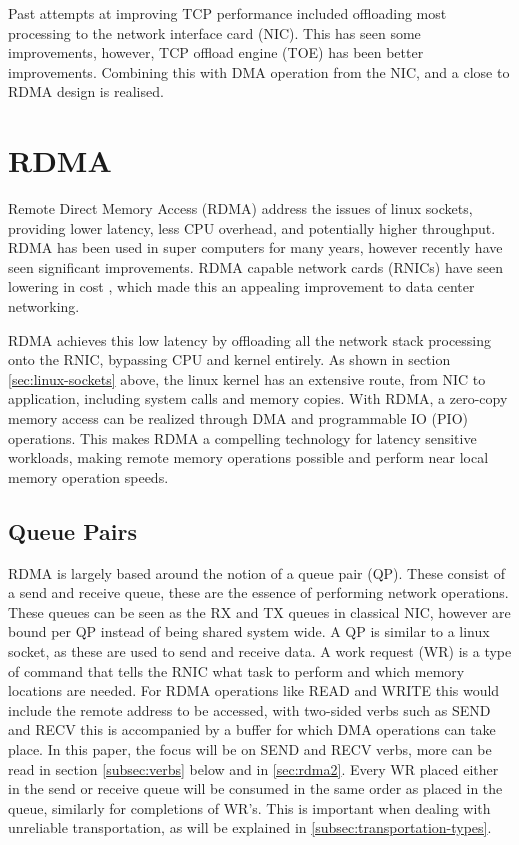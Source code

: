 Past attempts at improving TCP performance included offloading most processing to the network interface card (NIC).
This has seen some improvements, however, TCP offload engine (TOE) has been better improvements.
Combining this with DMA operation from the NIC, and a close to RDMA design is realised.

\section[RDMA]{RDMA}\label{sec:rdma}
Remote Direct Memory Access (RDMA) address the issues of linux sockets, providing lower latency, less CPU overhead, and potentially higher throughput.
RDMA has been used in super computers for many years, however recently have seen significant improvements.
RDMA capable network cards (RNICs) have seen lowering in cost \cite{kalia2016design}, which made this an appealing improvement to data center networking.

RDMA achieves this low latency by offloading all the network stack processing onto the RNIC, bypassing CPU and kernel entirely.
As shown in section \ref{sec:linux-sockets} above, the linux kernel has an extensive route, from NIC to application, including system calls and memory copies.
With RDMA, a zero-copy memory access can be realized through DMA and programmable IO (PIO) operations.
This makes RDMA a compelling technology for latency sensitive workloads, making remote memory operations possible and perform near local memory operation speeds.

\subsection{Queue Pairs}\label{subsec:queue-pairs}
RDMA is largely based around the notion of a queue pair (QP).
These consist of a send and receive queue, these are the essence of performing network operations.
These queues can be seen as the RX and TX queues in classical NIC, however are bound per QP instead of being shared system wide.
A QP is similar to a linux socket, as these are used to send and receive data.
A work request (WR) is a type of command that tells the RNIC what task to perform and which memory locations are needed.
For RDMA operations like READ and WRITE this would include the remote address to be accessed, with two-sided verbs such as SEND and RECV this is accompanied by a buffer for which DMA operations can take place.
In this paper, the focus will be on SEND and RECV verbs, more can be read in section \ref{subsec:verbs} below and in \ref{sec:rdma2}.
Every WR placed either in the send or receive queue will be consumed in the same order as placed in the queue, similarly for completions of WR's.
This is important when dealing with unreliable transportation, as will be explained in \ref{subsec:transportation-types}.

